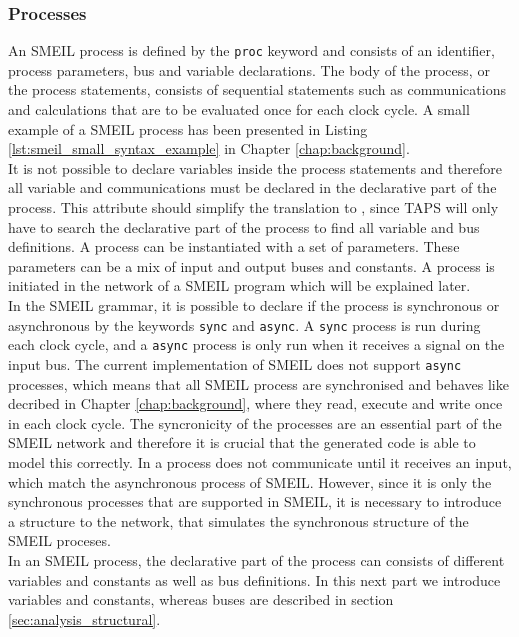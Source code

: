 \subsubsection{Processes}
An SMEIL process is defined by the \texttt{proc} keyword and consists of an identifier, process parameters, bus and variable declarations. The body of the process, or the process statements, consists of sequential statements such as communications and calculations that are to be evaluated once for each clock cycle. A small example of a SMEIL process has been presented in Listing \ref{lst:smeil_small_syntax_example} in Chapter \ref{chap:background}.\\

It is not possible to declare variables inside the process statements and therefore all variable and communications must be declared in the declarative part of the process. This attribute should simplify the translation to \cspm, since TAPS will only have to search the declarative part of the process to find all variable and bus definitions.
A process can be instantiated with a set of parameters. These parameters can be a mix of input and output buses and constants. A process is initiated in the network of a SMEIL program which will be explained later.\\

In the SMEIL grammar, it is possible to declare if the process is synchronous or asynchronous by the keywords \texttt{sync} and \texttt{async}. A \texttt{sync} process is run during each clock cycle, and a \texttt{async} process is only run when it receives a signal on the input bus. The current implementation of SMEIL does not support \texttt{async} processes, which means that all SMEIL process are synchronised and behaves like decribed in Chapter \ref{chap:background}, where they read, execute and write once in each clock cycle.
The syncronicity of the processes are an essential part of the SMEIL network and therefore it is crucial that the generated code is able to model this correctly. In \cspm{} a process does not communicate until it receives an input, which match the asynchronous process of SMEIL. However, since it is only the  synchronous processes that are supported in SMEIL, it is necessary to introduce
a structure to the \cspm{} network, that simulates the synchronous structure of the SMEIL proceses.
\\

In an SMEIL process, the declarative part of the process can consists of different variables and constants as well as bus definitions. In this next part we introduce variables and constants, whereas buses are described in section \ref{sec:analysis_structural}.
